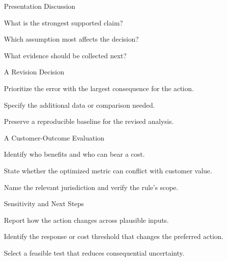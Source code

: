 \begin{frame}{Presentation Discussion}
\vfill
\begin{slidebullets}
\item What is the strongest supported claim?
\item Which assumption most affects the decision?
\item What evidence should be collected next?
\end{slidebullets}
\vfill
{}
\end{frame}
\begin{frame}{A Revision Decision}
\vfill
\begin{slidebullets}
\item Prioritize the error with the largest consequence for the action.
\item Specify the additional data or comparison needed.
\item Preserve a reproducible baseline for the revised analysis.
\end{slidebullets}
\vfill
{}
\end{frame}
\begin{frame}{A Customer-Outcome Evaluation}
\vfill
\begin{slidebullets}
\item Identify who benefits and who can bear a cost.
\item State whether the optimized metric can conflict with customer value.
\item Name the relevant jurisdiction and verify the rule's scope.
\end{slidebullets}
\vfill
{}
\end{frame}
\begin{frame}{Sensitivity and Next Steps}
\vfill
\begin{slidebullets}
\item Report how the action changes across plausible inputs.
\item Identify the response or cost threshold that changes the preferred action.
\item Select a feasible test that reduces consequential uncertainty.
\end{slidebullets}
\vfill
{}
\end{frame}

